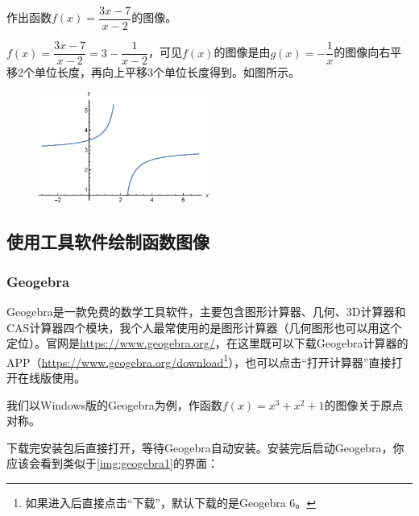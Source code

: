\documentclass[lang=cn,math=cm,chinesefont=nofont,11pt,scheme=chinese,twocol]{elegantbook}
\begin{document}
\begin{example}
  作出函数$f(x)=\dfrac{3x-7}{x-2}$的图像。
\end{example}

\begin{spacing}{1.8}
  
\end{spacing}
\begin{solution}
  \begin{spacing}{1.8}
    $f(x)=\dfrac{3x-7}{x-2}=3-\dfrac{1}{x-2}$，可见$f(x)$的图像是由$g(x)=-\dfrac{1}{x}$的图像向右平移2个单位长度，再向上平移$3$个单位长度得到。如图所示。
  \end{spacing}
\end{solution}

\begin{figure}[h]
  \centering
  \includegraphics[width=0.5\textwidth]{image/2.1.5function4.eps}
  \label{img:2.1.5function4}
\end{figure}

\subsection{使用工具软件绘制函数图像}

\subsubsection{Geogebra}

Geogebra是一款免费的数学工具软件，主要包含图形计算器、几何、3D计算器和CAS计算器四个模块，我个人最常使用的是图形计算器（几何图形也可以用这个定位）。官网是\href{https://www.geogebra.org/}{https://www.geogebra.org/}，在这里既可以下载Geogebra计算器的APP（\href{https://www.geogebra.org/download}{https://www.geogebra.org/download}\footnote{如果进入后直接点击“下载”，默认下载的是Geogebra 6。}），也可以点击“打开计算器”直接打开在线版使用。

我们以Windows版的Geogebra为例，作函数$f(x)=x^3+x^2+1$的图像关于原点对称。

下载完安装包后直接打开，等待Geogebra自动安装。安装完后启动Geogebra，你应该会看到类似于\ref{img:geogebra1}的界面：
\end{document}
